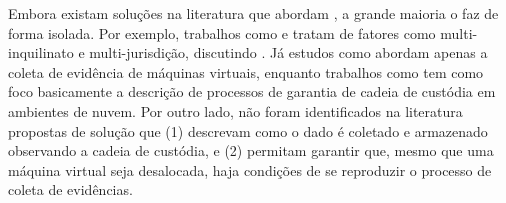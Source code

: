 \documentclass[conference]{IEEEtran}
\newcommand{\marcos}[1]{{\color{blue}{MARCOS: #1}}}
\begin{document}
%
Embora existam soluções na literatura que abordam \marcos{O QUE? SEJA PRECISO! Talvez ``forense computacional em ambientes de nuvem''?}, a grande maioria o faz de forma isolada.
%
Por exemplo, trabalhos como \marcos{ME DÊ UMA REFERÊNCIA DE EXEMPLO!} e \marcos{ME DÊ OUTRO EXEMPLO!} tratam de fatores como multi-inquilinato e multi-jurisdição, discutindo \marcos{O QUE ELE DISCUTE?}.
%
Já estudos como \marcos{ME DÊ EXEMPLOS!} abordam apenas a coleta de evidência de máquinas virtuais, enquanto trabalhos como \marcos{ME DÊ EXEMPLOS!} tem como foco basicamente a descrição de processos de garantia de cadeia de custódia em ambientes de nuvem.
%
%
%
Por outro lado, não foram identificados na literatura propostas de solução \marcos{``fim a fim'' (DE NOVO, ESSE TERMO NÃO ME SOA CORRETO... DEVE TER UM MELHOR...)} que (1) descrevam como o dado é coletado e armazenado observando a cadeia de custódia, e (2) permitam garantir que, mesmo que uma máquina virtual seja desalocada, haja condições de se reproduzir o processo de coleta de evidências.
\end{document}
